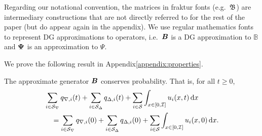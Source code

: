 Regarding our notational convention, the matrices in fraktur fonts (e.g.~\(\mathfrak{\boldsymbol B}\)) are intermediary constructions that are not directly referred to for the rest of the paper (but do appear again in the appendix). We use regular mathematics fonts to represent DG approximations to operators, i.e.~\(\boldsymbol B\) is a DG approximation to \(\mathbb B\) and \(\boldsymbol \Psi\) is an approximation to \(\mathbb \Psi\). 

We prove the following result in Appendix\ref{appendix:properties}.
\begin{cor}
	The approximate generator \( \boldsymbol B\) conserves probability. That is, for all \(t\geq 0\),
	\begin{align*}
	\begin{multlined}[t]\sum_{i\in\calS_\nabla}q_{\nabla,i}(t)+\sum_{i\in\calS_\Delta}q_{\Delta,i}(t)+\sum_{i\in\calS} \int_{x\in[0,\mathcal I]}u_i(x,t)\wrt x 
	\\= \sum_{i\in\calS_\nabla}q_{\nabla,i}(0)+\sum_{i\in\calS_\Delta}q_{\Delta,i}(0)+\sum_{i\in\calS} \int_{x\in[0,\mathcal I]}u_i(x,0)\wrt x.\end{multlined}
	\end{align*}
\end{cor}

